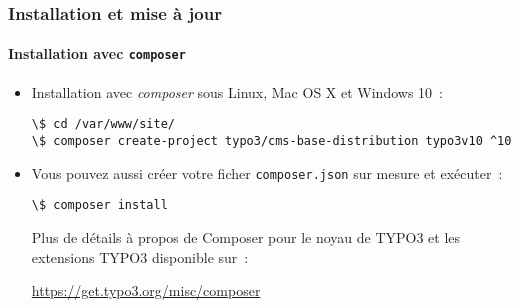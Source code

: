 
\begin{frame}[fragile]
	\frametitle{Installation et mise à jour}
	\framesubtitle{Installation avec \texttt{composer}}

	\begin{itemize}
		\item Installation avec \textit{composer} sous Linux, Mac OS X et Windows 10~:
\begin{lstlisting}
\$ cd /var/www/site/
\$ composer create-project typo3/cms-base-distribution typo3v10 ^10
\end{lstlisting}

		\item Vous pouvez aussi créer votre ficher \texttt{composer.json} sur mesure
			et exécuter~:
\begin{lstlisting}
\$ composer install
\end{lstlisting}

		Plus de détails à propos de Composer pour le noyau de TYPO3 et les extensions TYPO3
		disponible sur~:

		\small
			\href{https://get.typo3.org/misc/composer/}{https://get.typo3.org/misc/composer}
		\normalsize

	\end{itemize}
\end{frame}


